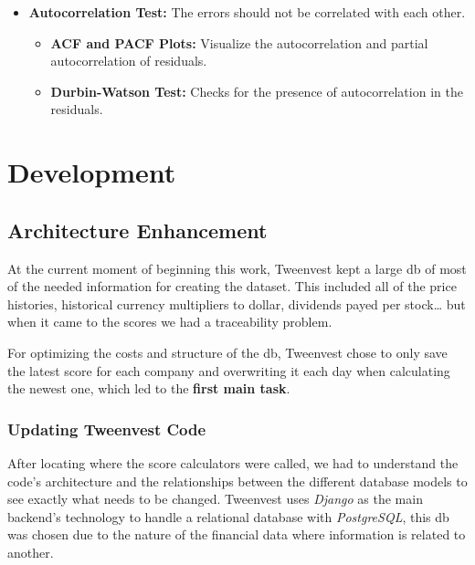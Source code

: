\documentclass[11pt,english,a4paper,hidelinks]{book}
\begin{document}
\begin{itemize}
\begin{itemize}
        \end{itemize}
    \item \textbf{Autocorrelation Test:} The errors should not be correlated with each other.
        \begin{itemize}
            \item \textbf{ACF and PACF Plots:} Visualize the autocorrelation and partial autocorrelation of residuals.
            \item \textbf{Durbin-Watson Test:} Checks for the presence of autocorrelation in the residuals.
        \end{itemize}
\end{itemize}

\chapter{Development}

\section{Architecture Enhancement}

\noindent At the current moment of beginning this work, Tweenvest kept a large \acrshort{db} of most of the needed information for creating the dataset. This included all of the price histories, historical currency multipliers to dollar, dividends payed per stock… but when it came to the scores we had a traceability problem.

\vspace{0.5cm}
\noindent For optimizing the costs and structure of the \acrshort{db}, Tweenvest chose to only save the latest score for each company and overwriting it each day when calculating the newest one, which led to the \textbf{first main task}.

\subsection{Updating Tweenvest Code}

After locating where the score calculators were called, we had to understand the code's architecture and the relationships between the different database models to see exactly what needs to be changed. Tweenvest uses \textit{Django} as the main backend's technology to handle a relational database with \textit{PostgreSQL}, this \acrshort{db} was chosen due to the nature of the financial data where information is related to another.
\end{document}
